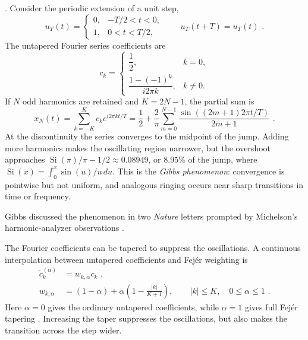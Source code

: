 . Consider the periodic extension of a unit step,
\begin{equation}
  u_T(t)=
  \begin{cases}
    0, & -T/2<t<0,\\
    1, & 0<t<T/2,
  \end{cases}
  \qquad u_T(t+T)=u_T(t) \,\,.
\end{equation}
The untapered Fourier series coefficients are
\begin{equation}
  c_k=
  \begin{cases}
    \dfrac{1}{2}, & k=0,\\[4pt]
    \dfrac{1-(-1)^k}{i2\pi k}, & k\ne 0.
  \end{cases}
  \label{eq:gibbs-untapered-coefficients}
\end{equation}
If $N$ odd harmonics are retained and $K=2N-1$, the partial sum is
\begin{equation}
  x_N(t)=\sum_{k=-K}^{K}c_k e^{i2\pi kt/T}
  =\frac{1}{2}+\frac{2}{\pi}\sum_{m=0}^{N-1}
  \frac{\sin\!\left((2m+1)2\pi t/T\right)}{2m+1} \,\,.
  \label{eq:gibbs-step-series}
\end{equation}
At the discontinuity the series converges to the midpoint of the jump. Adding
more harmonics makes the oscillating region narrower, but the overshoot
approaches
$\operatorname{Si}(\pi)/\pi-1/2\approx 0.08949$, or $8.95\%$ of the jump,
where $\operatorname{Si}(x)=\int_0^x \sin(u)/u\,du$. This is the
\emph{Gibbs phenomenon}: convergence is pointwise but not uniform, and
analogous ringing occurs near sharp transitions in time or frequency.

Gibbs discussed the phenomenon in two \emph{Nature} letters prompted by
Michelson's harmonic-analyzer observations
\cite{michelson1898fourier}\cite{gibbs1898fourier}\cite{gibbs1899fourier}.

The Fourier coefficients can be tapered to suppress the oscillations. A continuous interpolation between untapered coefficients and Fej\'er weighting is
\begin{align}
  \widetilde{c}_k^{(\alpha)} &= w_{k,\alpha}c_k \,\,,\label{eq:gibbs-tapered-coefficients}\\
  w_{k,\alpha} &= (1-\alpha)+\alpha\left(1-\frac{|k|}{K+1}\right),
  \qquad |k|\le K,\quad 0\le\alpha\le 1 \,\,.
\end{align}
Here $\alpha=0$ gives the ordinary untapered coefficients, while $\alpha=1$ gives full Fej\'er tapering \cite{fejer1900fonctions}. Increasing the taper suppresses the oscillations, but also makes the transition across the step wider.

